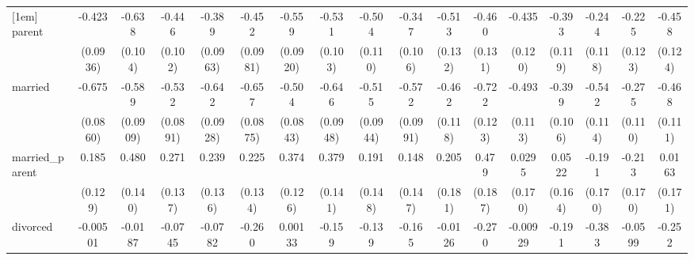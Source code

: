 {\begin{tabular}{l*{16}{c}}
[1em]
parent              &      -0.423\sym{***}&      -0.638\sym{***}&      -0.446\sym{***}&      -0.389\sym{***}&      -0.452\sym{***}&      -0.559\sym{***}&      -0.531\sym{***}&      -0.504\sym{***}&      -0.347\sym{**} &      -0.513\sym{***}&      -0.460\sym{***}&      -0.435\sym{***}&      -0.393\sym{***}&      -0.244\sym{*}  &      -0.225         &      -0.458\sym{***}\\
                    &    (0.0936)         &     (0.104)         &     (0.102)         &    (0.0963)         &    (0.0981)         &    (0.0920)         &     (0.103)         &     (0.110)         &     (0.106)         &     (0.132)         &     (0.131)         &     (0.120)         &     (0.119)         &     (0.118)         &     (0.123)         &     (0.124)         \\
[1em]
married             &      -0.675\sym{***}&      -0.589\sym{***}&      -0.532\sym{***}&      -0.642\sym{***}&      -0.657\sym{***}&      -0.504\sym{***}&      -0.646\sym{***}&      -0.515\sym{***}&      -0.572\sym{***}&      -0.462\sym{***}&      -0.722\sym{***}&      -0.493\sym{***}&      -0.399\sym{***}&      -0.542\sym{***}&      -0.275\sym{*}  &      -0.468\sym{***}\\
                    &    (0.0860)         &    (0.0909)         &    (0.0891)         &    (0.0928)         &    (0.0875)         &    (0.0843)         &    (0.0948)         &    (0.0944)         &    (0.0991)         &     (0.118)         &     (0.123)         &     (0.113)         &     (0.106)         &     (0.114)         &     (0.110)         &     (0.111)         \\
[1em]
married\_parent      &       0.185         &       0.480\sym{***}&       0.271\sym{*}  &       0.239         &       0.225         &       0.374\sym{**} &       0.379\sym{**} &       0.191         &       0.148         &       0.205         &       0.479\sym{*}  &      0.0295         &      0.0522         &      -0.191         &      -0.213         &      0.0163         \\
                    &     (0.129)         &     (0.140)         &     (0.137)         &     (0.136)         &     (0.134)         &     (0.126)         &     (0.141)         &     (0.148)         &     (0.147)         &     (0.181)         &     (0.187)         &     (0.170)         &     (0.164)         &     (0.170)         &     (0.170)         &     (0.171)         \\
[1em]
divorced            &    -0.00501         &     -0.0187         &     -0.0745         &     -0.0782         &      -0.260\sym{*}  &     0.00133         &      -0.159         &      -0.139         &      -0.165         &     -0.0126         &      -0.270         &    -0.00929         &      -0.191         &      -0.383\sym{**} &     -0.0599         &      -0.252         \\

\end{tabular}}
